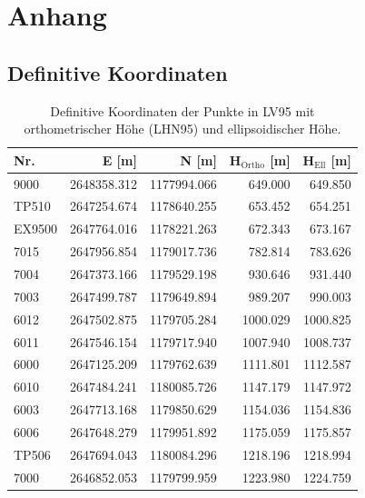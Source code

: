 \clearpage
\section{Anhang}
\label{sec:anhang}

\captionsetup[table]{list=no}

\subsection{Definitive Koordinaten}
\label{subsec:definitive-koordinaten}

\begin{table}[htbp]
    \centering
    \caption{Definitive Koordinaten der Punkte in LV95 mit orthometrischer Höhe (LHN95) und ellipsoidischer Höhe.}
    \label{tab:definitive-koordinaten}
    \begin{tabular}{lrrrr}
        \toprule
        \textbf{Nr.} & \textbf{E [m]} & \textbf{N [m]} & \textbf{$\boldsymbol{H_\mathrm{Ortho}}$ [m]} & \textbf{$\boldsymbol{H_\mathrm{Ell}}$ [m]} \\
        \midrule
        9000   & 2648358.312 & 1177994.066 &  649.000 &  649.850 \\
        \rowcolor{lightgray}
        TP510  & 2647254.674 & 1178640.255 &  653.452 &  654.251 \\
        EX9500 & 2647764.016 & 1178221.263 &  672.343 &  673.167 \\
        \rowcolor{lightgray}
        7015   & 2647956.854 & 1179017.736 &  782.814 &  783.626 \\
        7004   & 2647373.166 & 1179529.198 &  930.646 &  931.440 \\
        \rowcolor{lightgray}
        7003   & 2647499.787 & 1179649.894 &  989.207 &  990.003 \\
        6012   & 2647502.875 & 1179705.284 & 1000.029 & 1000.825 \\
        \rowcolor{lightgray}
        6011   & 2647546.154 & 1179717.940 & 1007.940 & 1008.737 \\
        6000   & 2647125.209 & 1179762.639 & 1111.801 & 1112.587 \\
        \rowcolor{lightgray}
        6010   & 2647484.241 & 1180085.726 & 1147.179 & 1147.972 \\
        6003   & 2647713.168 & 1179850.629 & 1154.036 & 1154.836 \\
        \rowcolor{lightgray}
        6006   & 2647648.279 & 1179951.892 & 1175.059 & 1175.857 \\
        TP506  & 2647694.043 & 1180084.296 & 1218.196 & 1218.994 \\
        \rowcolor{lightgray}
        7000   & 2646852.053 & 1179799.959 & 1223.980 & 1224.759 \\
        \bottomrule
    \end{tabular}
\end{table}


